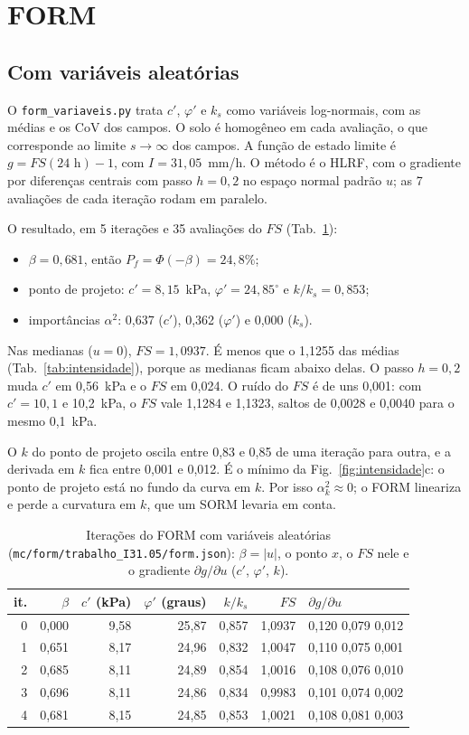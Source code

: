 \documentclass[11pt,a4paper]{article}
\begin{document}
\section{FORM}\label{sec:form}
\subsection{Com variáveis aleatórias}
O \texttt{form\_variaveis.py} trata $c'$, $\varphi'$ e $k_s$ como variáveis log-normais, com as médias e os CoV dos
campos. O solo é homogêneo em cada avaliação, o que corresponde ao limite $s \to \infty$ dos campos. A função de estado
limite é $g = FS(24\text{ h}) - 1$, com $I = 31{,}05$~mm/h. O método é o HLRF, com o gradiente por diferenças centrais
com passo $h = 0{,}2$ no espaço normal padrão $u$; as 7 avaliações de cada iteração rodam em paralelo.

O resultado, em 5 iterações e 35 avaliações do $FS$ (Tab.~\ref{tab:form}):
\begin{itemize}
\item $\beta = 0{,}681$, então $P_f = \Phi(-\beta) = 24{,}8\%$;
\item ponto de projeto: $c' = 8{,}15$~kPa, $\varphi' = 24{,}85^\circ$ e $k/k_s = 0{,}853$;
\item importâncias $\alpha^2$: 0,637 ($c'$), 0,362 ($\varphi'$) e 0,000 ($k_s$).
\end{itemize}
Nas medianas ($u = 0$), $FS = 1{,}0937$. É menos que o 1,1255 das médias (Tab.~\ref{tab:intensidade}), porque as
medianas ficam abaixo delas. O passo
$h = 0{,}2$ muda $c'$ em 0,56~kPa e o $FS$ em 0,024. O ruído do $FS$ é de uns 0,001: com $c' = 10{,}1$ e 10,2~kPa, o $FS$
vale 1,1284 e 1,1323, saltos de 0,0028 e 0,0040 para o mesmo 0,1~kPa.

O $k$ do ponto de projeto oscila entre 0,83 e 0,85 de uma iteração para outra, e a derivada em $k$ fica entre 0,001 e
0,012. É o mínimo da Fig.~\ref{fig:intensidade}c: o ponto de projeto está no fundo da curva em $k$. Por isso
$\alpha_k^2 \approx 0$; o FORM lineariza e perde a curvatura em $k$, que um SORM levaria em conta.

\begin{table}[htbp]\centering\footnotesize
\caption{Iterações do FORM com variáveis aleatórias (\texttt{mc/form/trabalho\_I31.05/form.json}): $\beta = |u|$, o
ponto $x$, o $FS$ nele e o gradiente $\partial g/\partial u$ ($c'$, $\varphi'$, $k$).}\label{tab:form}
\begin{tabular}{rrrrrrl}\toprule
it. & $\beta$ & $c'$ (kPa) & $\varphi'$ (graus) & $k/k_s$ & $FS$ & $\partial g/\partial u$ \\\midrule
0 & 0,000 & 9,58 & 25,87 & 0,857 & 1,0937 & 0,120 0,079 0,012 \\
1 & 0,651 & 8,17 & 24,96 & 0,832 & 1,0047 & 0,110 0,075 0,001 \\
2 & 0,685 & 8,11 & 24,89 & 0,854 & 1,0016 & 0,108 0,076 0,010 \\
3 & 0,696 & 8,11 & 24,86 & 0,834 & 0,9983 & 0,101 0,074 0,002 \\
4 & 0,681 & 8,15 & 24,85 & 0,853 & 1,0021 & 0,108 0,081 0,003 \\
\bottomrule\end{tabular}\end{table}
\end{document}
